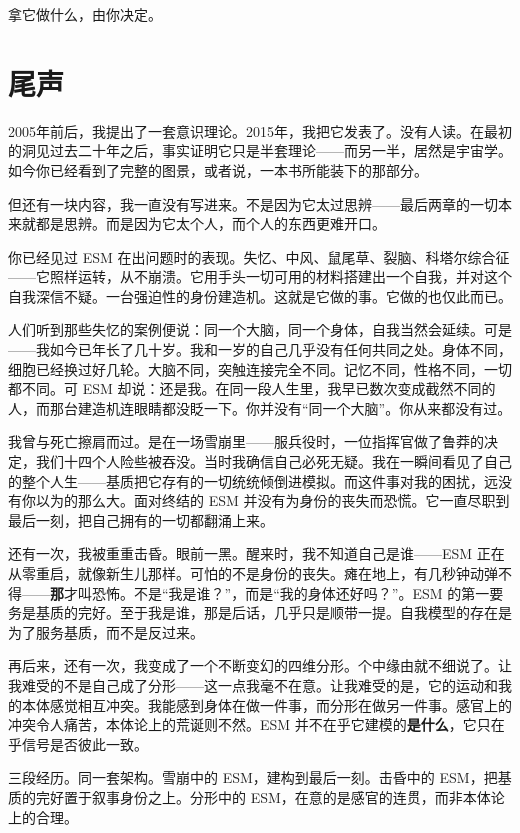 \documentclass[11pt, twoside, openright]{book}
\begin{document}
拿它做什么，由你决定。


\chapter*{尾声}

2005年前后，我提出了一套意识理论。2015年，我把它发表了。没有人读。在最初的洞见过去二十年之后，事实证明它只是半套理论------而另一半，居然是宇宙学。如今你已经看到了完整的图景，或者说，一本书所能装下的那部分。

但还有一块内容，我一直没有写进来。不是因为它太过思辨------最后两章的一切本来就都是思辨。而是因为它太个人，而个人的东西更难开口。

你已经见过 ESM 在出问题时的表现。失忆、中风、鼠尾草、裂脑、科塔尔综合征------它照样运转，从不崩溃。它用手头一切可用的材料搭建出一个自我，并对这个自我深信不疑。一台强迫性的身份建造机。这就是它做的事。它做的也仅此而已。

人们听到那些失忆的案例便说：同一个大脑，同一个身体，自我当然会延续。可是------我如今已年长了几十岁。我和一岁的自己几乎没有任何共同之处。身体不同，细胞已经换过好几轮。大脑不同，突触连接完全不同。记忆不同，性格不同，一切都不同。可 ESM 却说：还是我。在同一段人生里，我早已数次变成截然不同的人，而那台建造机连眼睛都没眨一下。你并没有“同一个大脑”。你从来都没有过。

我曾与死亡擦肩而过。是在一场雪崩里------服兵役时，一位指挥官做了鲁莽的决定，我们十四个人险些被吞没。当时我确信自己必死无疑。我在一瞬间看见了自己的整个人生------基质把它存有的一切统统倾倒进模拟。而这件事对我的困扰，远没有你以为的那么大。面对终结的 ESM 并没有为身份的丧失而恐慌。它一直尽职到最后一刻，把自己拥有的一切都翻涌上来。

还有一次，我被重重击昏。眼前一黑。醒来时，我不知道自己是谁------ESM 正在从零重启，就像新生儿那样。可怕的不是身份的丧失。瘫在地上，有几秒钟动弹不得------\textbf{那}才叫恐怖。不是“我是谁？”，而是“我的身体还好吗？”。ESM 的第一要务是基质的完好。至于我是谁，那是后话，几乎只是顺带一提。自我模型的存在是为了服务基质，而不是反过来。

再后来，还有一次，我变成了一个不断变幻的四维分形。个中缘由就不细说了。让我难受的不是自己成了分形------这一点我毫不在意。让我难受的是，它的运动和我的本体感觉相互冲突。我能感到身体在做一件事，而分形在做另一件事。感官上的冲突令人痛苦，本体论上的荒诞则不然。ESM 并不在乎它建模的\textbf{是什么}，它只在乎信号是否彼此一致。

三段经历。同一套架构。雪崩中的 ESM，建构到最后一刻。击昏中的 ESM，把基质的完好置于叙事身份之上。分形中的 ESM，在意的是感官的连贯，而非本体论上的合理。
\end{document}
